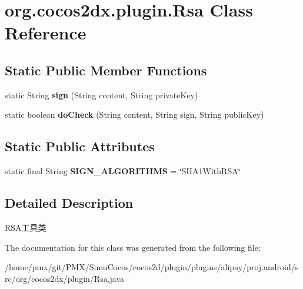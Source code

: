 \hypertarget{classorg_1_1cocos2dx_1_1plugin_1_1Rsa}{}\section{org.\+cocos2dx.\+plugin.\+Rsa Class Reference}
\label{classorg_1_1cocos2dx_1_1plugin_1_1Rsa}
\subsection*{Static Public Member Functions}
\begin{DoxyCompactItemize}
\item 
\mbox{\label{classorg_1_1cocos2dx_1_1plugin_1_1Rsa_afa6a3f5df5d3856dda9e7a6d6aba15e6}} 
static String {\bfseries sign} (String content, String private\+Key)
\item 
\mbox{\label{classorg_1_1cocos2dx_1_1plugin_1_1Rsa_a66f4c3c6473ac4244fd9427cad34e37b}} 
static boolean {\bfseries do\+Check} (String content, String sign, String public\+Key)
\end{DoxyCompactItemize}
\subsection*{Static Public Attributes}
\begin{DoxyCompactItemize}
\item 
\mbox{\label{classorg_1_1cocos2dx_1_1plugin_1_1Rsa_afe32a5408fd1a2caaa9d27e973d086d1}} 
static final String {\bfseries S\+I\+G\+N\+\_\+\+A\+L\+G\+O\+R\+I\+T\+H\+MS} = \char`\"{}S\+H\+A1\+With\+R\+SA\char`\"{}
\end{DoxyCompactItemize}


\subsection{Detailed Description}
R\+S\+A工具类 

The documentation for this class was generated from the following file\+:\begin{DoxyCompactItemize}
\item 
/home/pmx/git/\+P\+M\+X/\+Simu\+Cocos/cocos2d/plugin/plugins/alipay/proj.\+android/src/org/cocos2dx/plugin/Rsa.\+java\end{DoxyCompactItemize}
